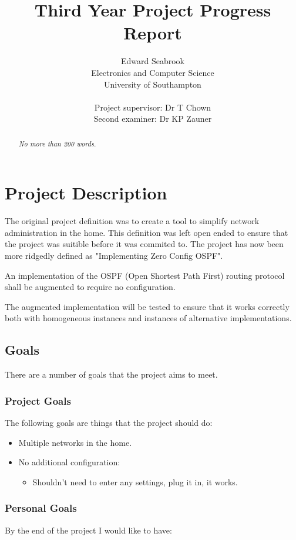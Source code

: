 \documentclass[12pt]{report}
\author{Edward Seabrook \\ 
Electronics and Computer Science \\ 
University of Southampton \\ \\
Project supervisor: Dr T Chown \\
Second examiner: Dr KP Zauner}
\title{Third Year Project Progress Report}
\begin{document}



\begin{abstract}
\em No more than 200 words. \em


\end{abstract}

\tableofcontents

\chapter{Project Description}

The original project definition was to create a tool to simplify network administration in the home.
This definition was left open ended to ensure that the project was suitible before it was commited to.
The project has now been more ridgedly defined as "Implementing Zero Config OSPF".

An implementation of the OSPF (Open Shortest Path First) routing protocol shall be 
augmented to require no configuration.

The augmented implementation will be tested to ensure that it works correctly both with homogeneous instances and instances of alternative implementations. 

\section{Goals}

There are a number of goals that the project aims to meet.

\subsection{Project Goals }
The following goals are things that the project should do:

\begin{itemize}

	\item Multiple networks in the home. 

	\item No additional configuration:

		\begin{itemize}	
  		\item Shouldn't need to enter any settings, plug it in, it works. 
		\end{itemize}
\end{itemize}

\subsection{Personal Goals}
By the end of the project I would like to have:
\end{document}
